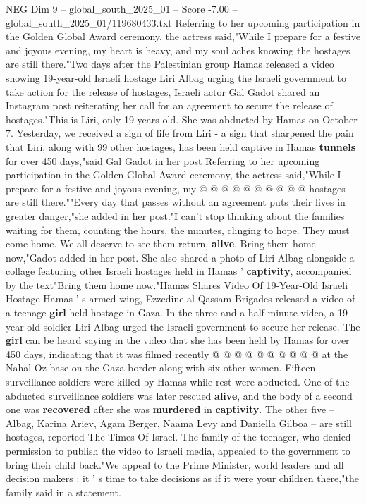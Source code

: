 \begin{textsample}{NEG Dim 9 – global\_south\_2025\_01 – Score -7.00 – global\_south\_2025\_01/119680433.txt}  \label{ex:f9_neg_135}
Referring to her upcoming participation in the Golden Global Award ceremony, the actress said,"While I prepare for a festive and joyous evening, my heart is heavy, and my soul aches knowing the hostages are still there."Two days after the Palestinian group Hamas released a video showing 19-year-old Israeli hostage Liri Albag urging the Israeli government to take action for the release of hostages, Israeli actor Gal Gadot shared an Instagram post reiterating her call for an agreement to secure the release of hostages."This is Liri, only 19 years old.
She was abducted by Hamas on October 7.
Yesterday, we received a sign of life from Liri - a sign that sharpened the pain that Liri, along with 99 other hostages, has been held captive in Hamas \textbf{tunnels} for over 450 days,"said Gal Gadot in her post Referring to her upcoming participation in the Golden Global Award ceremony, the actress said,"While I prepare for a festive and joyous evening, my @ @ @ @ @ @ @ @ @ @ hostages are still there.""Every day that passes without an agreement puts their lives in greater danger,"she added in her post."I can't stop thinking about the families waiting for them, counting the hours, the minutes, clinging to hope.
They must come home.
We all deserve to see them return, \textbf{alive}.
Bring them home now,"Gadot added in her post.
She also shared a photo of Liri Albag alongside a collage featuring other Israeli hostages held in Hamas ' \textbf{captivity}, accompanied by the text"Bring them home now."Hamas Shares Video Of 19-Year-Old Israeli Hostage Hamas ' s armed wing, Ezzedine al-Qassam Brigades released a video of a teenage \textbf{girl} held hostage in Gaza.
In the three-and-a-half-minute video, a 19-year-old soldier Liri Albag urged the Israeli government to secure her release.
The \textbf{girl} can be heard saying in the video that she has been held by Hamas for over 450 days, indicating that it was filmed recently @ @ @ @ @ @ @ @ @ @ at the Nahal Oz base on the Gaza border along with six other women.
Fifteen surveillance soldiers were killed by Hamas while rest were abducted.
One of the abducted surveillance soldiers was later rescued \textbf{alive}, and the body of a second one was \textbf{recovered} after she was \textbf{murdered} in \textbf{captivity}.
The other five -- Albag, Karina Ariev, Agam Berger, Naama Levy and Daniella Gilboa -- are still hostages, reported The Times Of Israel.
The family of the teenager, who denied permission to publish the video to Israeli media, appealed to the government to bring their child back."We appeal to the Prime Minister, world leaders and all decision makers : it ' s time to take decisions as if it were your children there,"the family said in a statement.

\end{textsample}
